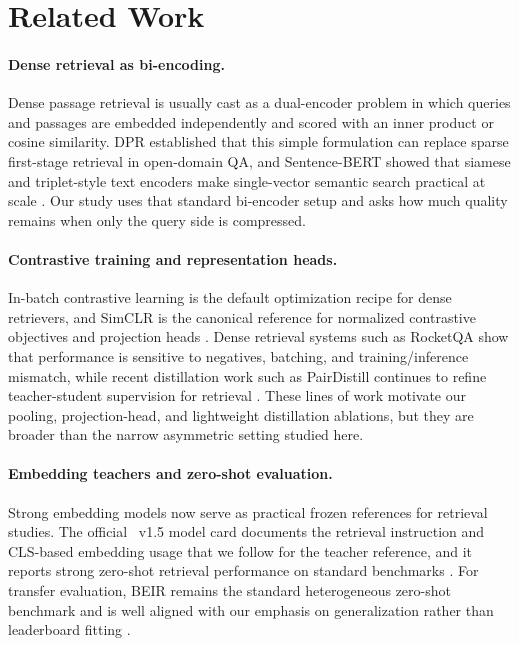 \section{Related Work}

\paragraph{Dense retrieval as bi-encoding.}
Dense passage retrieval is usually cast as a dual-encoder problem in which queries and passages are embedded independently and scored with an inner product or cosine similarity. DPR established that this simple formulation can replace sparse first-stage retrieval in open-domain QA, and Sentence-BERT showed that siamese and triplet-style text encoders make single-vector semantic search practical at scale \cite{karpukhin-etal-2020-dense,reimers-gurevych-2019-sentence}. Our study uses that standard bi-encoder setup and asks how much quality remains when only the query side is compressed.

\paragraph{Contrastive training and representation heads.}
In-batch contrastive learning is the default optimization recipe for dense retrievers, and SimCLR is the canonical reference for normalized contrastive objectives and projection heads \cite{chen-etal-2020-simclr}. Dense retrieval systems such as RocketQA show that performance is sensitive to negatives, batching, and training/inference mismatch, while recent distillation work such as PairDistill continues to refine teacher-student supervision for retrieval \cite{qu-etal-2021-rocketqa,huang-chen-2024-pairdistill}. These lines of work motivate our pooling, projection-head, and lightweight distillation ablations, but they are broader than the narrow asymmetric setting studied here.

\paragraph{Embedding teachers and zero-shot evaluation.}
Strong embedding models now serve as practical frozen references for retrieval studies. The official \bgebase\ v1.5 model card documents the retrieval instruction and CLS-based embedding usage that we follow for the teacher reference, and it reports strong zero-shot retrieval performance on standard benchmarks \cite{bge-base-en-v15-modelcard}. For transfer evaluation, BEIR remains the standard heterogeneous zero-shot benchmark and is well aligned with our emphasis on generalization rather than leaderboard fitting \cite{thakur-etal-2021-beir}.

